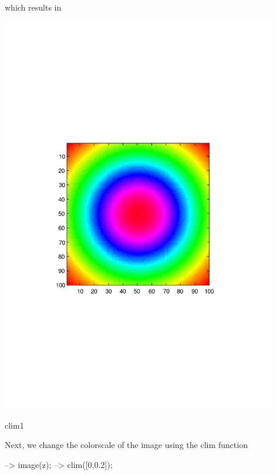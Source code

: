 which results in  
\begin{DoxyImage}
\includegraphics[width=12cm]{clim1}
\caption{clim1}
\end{DoxyImage}
 Next, we change the colorscale of the image using the {\ttfamily clim} function


\begin{DoxyVerbInclude}
--> image(z);
--> clim([0,0.2]);
\end{DoxyVerbInclude}


